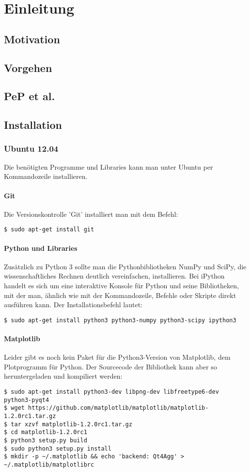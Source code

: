 \chapter{Einleitung}
\section{Motivation}
\section{Vorgehen}
\section{PeP et al.}

\section{Installation}
\subsection{Ubuntu 12.04}
Die benötigten Programme und Libraries kann man unter Ubuntu per Kommandozeile installieren.

\subsubsection{Git}
Die Versionskontrolle 'Git' installiert man mit dem Befehl:
\begin{verbatim}
$ sudo apt-get install git
\end{verbatim}

\subsubsection{Python und Libraries}
Zusätzlich zu Python 3 sollte man die Pythonbibliotheken NumPy und SciPy, die wissenschaftliches Rechnen deutlich vereinfachen, installieren.
Bei iPython handelt es sich um eine interaktive Konsole für Python und seine Bibliotheken, mit der man, ähnlich wie mit der Kommandozeile, Befehle oder Skripte direkt ausführen kann.
Der Installationsbefehl lautet:
\begin{verbatim}
$ sudo apt-get install python3 python3-numpy python3-scipy ipython3
\end{verbatim}

\subsubsection{Matplotlib}
Leider gibt es noch kein Paket für die Python3-Version von Matplotlib, dem Plotprogramm für Python.
Der Sourcecode der Bibliothek kann aber so heruntergeladen und kompiliert werden:
\begin{verbatim}
$ sudo apt-get install python3-dev libpng-dev libfreetype6-dev python3-pyqt4
$ wget https://github.com/matplotlib/matplotlib/matplotlib-1.2.0rc1.tar.gz
$ tar xzvf matplotlib-1.2.0rc1.tar.gz
$ cd matplotlib-1.2.0rc1
$ python3 setup.py build
$ sudo python3 setup.py install
$ mkdir -p ~/.matplotlib && echo 'backend: Qt4Agg' > ~/.matplotlib/matplotlibrc
\end{verbatim}


